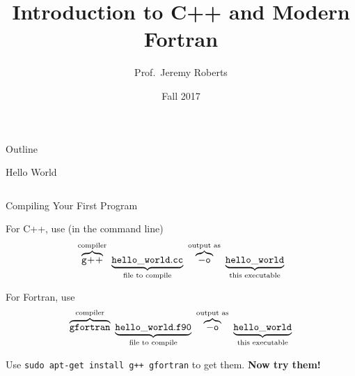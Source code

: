 \documentclass[10pt]{beamer}
\title %
[C++ and Fortran]{Introduction to C++ and Modern Fortran}
\author[Roberts]{Prof.~Jeremy Roberts}
\date
{Fall 2017}
\begin{document}
\begin{frame}[plain]
  \titlepage
\end{frame}

\begin{frame}{Outline}
  \tableofcontents
\end{frame}




\begin{frame}{Hello World}

\begin{columns}[c]
  \begin{column}{0.5\textwidth}
    
  \end{column}
  \begin{column}{0.5\textwidth}
    
  \end{column}
\end{columns}

\end{frame}

\begin{frame}{Compiling Your First Program}

For C++, use (in the command line)
\begin{equation*}
 \overbrace{\tt g\!+\!+}^{\text{compiler}}~
   \underbrace{\tt{hello\_world.cc}}_{\text{file to compile}}~
     \overbrace{\tt{-o}}^{\text{output as}}~
       \underbrace{\tt{hello\_world}}_{\text{this executable}} 
\end{equation*}
\vfill 

For Fortran, use
\begin{equation*}
 \overbrace{\tt gfortran}^{\text{compiler}}~
   \underbrace{\tt{hello\_world.f90}}_{\text{file to compile}}~
     \overbrace{\tt{-o}}^{\text{output as}}~
       \underbrace{\tt{hello\_world}}_{\text{this executable}} 
\end{equation*}

\vfill 
Use {\tt sudo apt-get install g++ gfortran} to get them.
{\bf Now try them!}

\end{frame}
\end{document}
